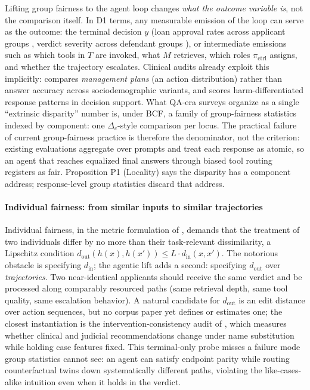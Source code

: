 \documentclass[acmsmall,nonacm]{acmart}
\begin{document}
Lifting group fairness to the agent loop changes \emph{what the outcome variable is}, not the comparison itself. In D1 terms, any measurable emission of the loop can serve as the outcome: the terminal decision $y$ (loan approval rates across applicant groups \cite{azime2025accept}, verdict severity across defendant groups \cite{hu2025llms}), or intermediate emissions such as which tools in $T$ are invoked, what $M$ retrieves, which roles $\pi_{\mathrm{ctrl}}$ assigns, and whether the trajectory escalates. Clinical audits already exploit this implicitly: \cite{omar2025sociodemographic} compares \emph{management plans} (an action distribution) rather than answer accuracy across sociodemographic variants, and \cite{adappanavar2025mfarm} scores harm-differentiated response patterns in decision support. What QA-era surveys organize as a single ``extrinsic disparity'' number \cite{gallegos2024bias,chu2024fairness} is, under BCF, a family of group-fairness statistics indexed by component: one $\Delta_c$-style comparison per locus. The practical failure of current group-fairness practice is therefore the denominator, not the criterion: existing evaluations aggregate over prompts and treat each response as atomic, so an agent that reaches equalized final answers through biased tool routing registers as fair. Proposition P1 (Locality) says the disparity has a component address; response-level group statistics discard that address.

\paragraph{Individual fairness: from similar inputs to similar trajectories}

Individual fairness, in the metric formulation of \cite{dwork2012fairness}, demands that the treatment of two individuals differ by no more than their task-relevant dissimilarity, a Lipschitz condition $d_{\mathrm{out}}(h(x), h(x')) \le L \cdot d_{\mathrm{in}}(x, x')$. The notorious obstacle is specifying $d_{\mathrm{in}}$; the agentic lift adds a second: specifying $d_{\mathrm{out}}$ over \emph{trajectories}. Two near-identical applicants should receive the same verdict and be processed along comparably resourced paths (same retrieval depth, same tool quality, same escalation behavior). A natural candidate for $d_{\mathrm{out}}$ is an edit distance over action sequences, but no corpus paper yet defines or estimates one; the closest instantiation is the intervention-consistency audit of \cite{basu2026names}, which measures whether clinical and judicial recommendations change under name substitution while holding case features fixed. This terminal-only probe misses a failure mode group statistics cannot see: an agent can satisfy endpoint parity while routing counterfactual twins down systematically different paths, violating the like-cases-alike intuition even when it holds in the verdict.
\end{document}
